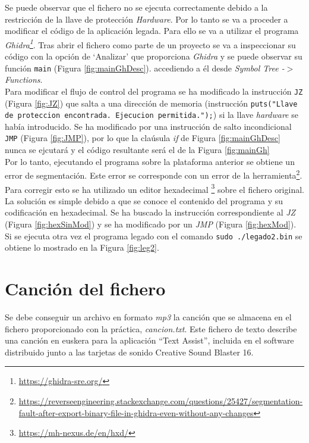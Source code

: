 \documentclass{article}
\begin{document}
Se puede observar que el fichero no se ejecuta correctamente debido a la restricción de la llave de protección \textit{Hardware}. Por lo tanto se va a proceder a modificar el código de la aplicación legada. Para ello se va a utilizar el programa \textit{Ghidra\footnote{\url{https://ghidra-sre.org/}}}. Tras abrir el fichero como parte de un proyecto se va a inspeccionar su código con la opción de `Analizar' que proporciona \textit{Ghidra} y se puede observar su función \texttt{main} (Figura \ref{fig:mainGhDesc}). accediendo a él desde \emph{Symbol Tree -$>$ Functions}.\\

Para modificar el flujo de control del programa se ha modificado la instrucción \texttt{JZ} (Figura \ref{fig:JZ}) que salta a una dirección de memoria (instrucción \texttt{puts("Llave de proteccion encontrada. Ejecucion permitida.");}) si la llave \textit{hardware} se había introducido. Se ha modificado por una instrucción de salto incondicional \texttt{JMP} (Figura \ref{fig:JMP}), por lo que la claúsula \emph{if} de Figura \ref{fig:mainGhDesc} nunca se ejcutará y el código resultante será el de la Figura \ref{fig:mainGh}\\

Por lo tanto, ejecutando el programa sobre la plataforma anterior se obtiene un error de segmentación. Este error se corresponde con un error de la herramienta\footnote{\url{https://reverseengineering.stackexchange.com/questions/25427/segmentation-fault-after-export-binary-file-in-ghidra-even-without-any-changes}}. Para corregir esto se ha utilizado un editor hexadecimal \footnote{\url{https://mh-nexus.de/en/hxd/}} sobre el fichero original. La solución es simple debido a que se conoce el contenido del programa y su codificación en hexadecimal. Se ha buscado la instrucción correspondiente al \textit{JZ} (Figura \ref{fig:hexSinMod}) y se ha modificado por un \textit{JMP} (Figura \ref{fig:hexMod}). Si se ejecuta otra vez el programa legado con el comando \texttt{sudo ./legado2.bin} se obtiene lo mostrado en la Figura \ref{fig:leg2}.\\


\section{Canción del fichero}

Se debe conseguir un archivo en formato \emph{mp3} la canción que se almacena en el fichero proporcionado con la práctica, \emph{cancion.txt}. Este fichero de texto describe una canción en euskera para la aplicación “Text Assist”, incluida en el software distribuido junto a las tarjetas de sonido Creative Sound Blaster 16. \\
\end{document}
